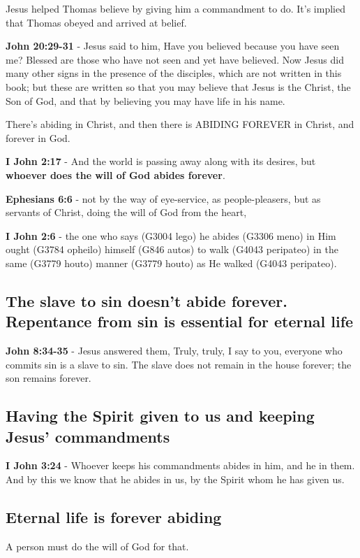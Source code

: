 \documentclass[11pt]{article}
\begin{document}
Jesus helped Thomas believe by giving him a commandment to do. It's implied that Thomas obeyed and arrived at belief.

\textbf{John 20:29-31} - Jesus said to him, Have you believed because you have seen me? Blessed are those who have not seen and yet have believed.  Now Jesus did many other signs in the presence of the disciples, which are not written in this book; but these are written so that you may believe that Jesus is the Christ, the Son of God, and that by believing you may have life in his name.

There's abiding in Christ, and then there is ABIDING FOREVER in Christ, and forever in God.

\textbf{I John 2:17} - And the world is passing away along with its desires, but \textbf{whoever does the will of God abides forever}.

\textbf{Ephesians 6:6} - not by the way of eye-service, as people-pleasers, but as servants of Christ, doing the will of God from the heart,

\textbf{I John 2:6} - the one who says (G3004 lego) he abides (G3306 meno) in Him ought (G3784 opheilo) himself (G846 autos) to walk (G4043 peripateo) in the same (G3779 houto) manner (G3779 houto) as He walked (G4043 peripateo).

\subsection{The slave to sin doesn't abide forever. Repentance from sin is essential for eternal life}
\label{sec:org085ec16}
\textbf{John 8:34-35} - Jesus answered them, Truly, truly, I say to you, everyone who commits sin is a slave to sin. The slave does not remain in the house forever; the son remains forever.

\subsection{Having the Spirit given to us and keeping Jesus' commandments}
\label{sec:org8c031a0}
\textbf{I John 3:24} - Whoever keeps his commandments abides in him, and he in them. And by this we know that he abides in us, by the Spirit whom he has given us.

\subsection{Eternal life is forever abiding}
\label{sec:org605603d}
A person must do the will of God for that.
\end{document}
